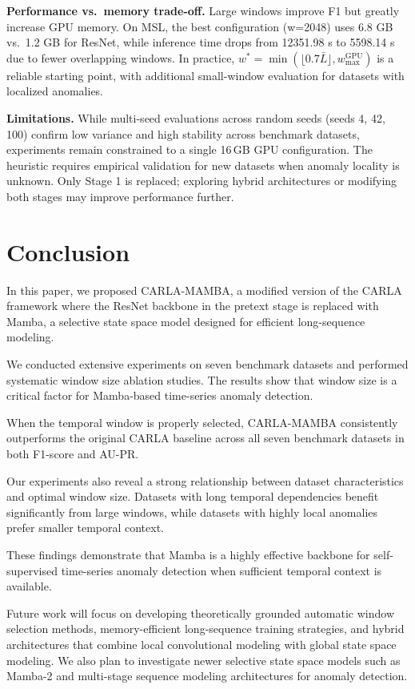\documentclass[runningheads]{llncs}
\begin{document}
\textbf{Performance vs.\ memory trade-off.}
Large windows improve F1 but greatly increase GPU memory. On MSL, the best configuration (w=2048) uses 6.8 GB vs.\ 1.2 GB for ResNet, while inference time drops from 12351.98 s to 5598.14 s due to fewer overlapping windows. In practice, $w^* = \min(\lfloor 0.7\bar{L} \rfloor, w_{\max}^{\text{GPU}})$ is a reliable starting point, with additional small-window evaluation for datasets with localized anomalies.
 
\textbf{Limitations.}
While multi-seed evaluations across random seeds (seeds 4, 42, 100) confirm low variance and high stability across benchmark datasets, experiments remain constrained to a single 16\,GB GPU configuration. The heuristic requires empirical validation for new datasets when anomaly locality is unknown. Only Stage 1 is replaced; exploring hybrid architectures or modifying both stages may improve performance further.

\section{Conclusion}

In this paper, we proposed CARLA-MAMBA, a modified version of the CARLA framework where the ResNet backbone in the pretext stage is replaced with Mamba, a selective state space model designed for efficient long-sequence modeling.

We conducted extensive experiments on seven benchmark datasets and performed systematic window size ablation studies. The results show that window size is a critical factor for Mamba-based time-series anomaly detection.

When the temporal window is properly selected, CARLA-MAMBA consistently outperforms the original CARLA baseline across all seven benchmark datasets in both F1-score and AU-PR.

Our experiments also reveal a strong relationship between dataset characteristics and optimal window size. Datasets with long temporal dependencies benefit significantly from large windows, while datasets with highly local anomalies prefer smaller temporal context.

These findings demonstrate that Mamba is a highly effective backbone for self-supervised time-series anomaly detection when sufficient temporal context is available.

Future work will focus on developing theoretically grounded automatic window selection methods, memory-efficient long-sequence training strategies, and hybrid architectures that combine local convolutional modeling with global state space modeling. We also plan to investigate newer selective state space models such as Mamba-2 and multi-stage sequence modeling architectures for anomaly detection.
\end{document}
